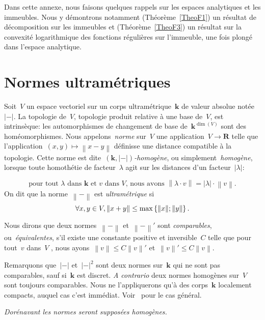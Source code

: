 \documentclass[french]{amsart}
\newcommand{\kk}{\mathbf{k}}
\newcommand{\abs}[1]{{\left|{#1}\right|}}
\newcommand{\Nm}[1]{{\left\|{#1}\right\|}}
\newcommand{\R}{\mathbf{R}}
\begin{document}
\appendix
\renewcommand{\appendixpagename}{Annexe}
\appendixpage
Dans cette annexe, nous faisons quelques rappels sur  les espaces analytiques et les immeubles. Nous y démontrons notamment (Thé\-o\-rè\-me~\ref{TheoF1})
un résultat de décomposition sur les immeubles et (Théorème~\ref{TheoF3}) un résultat sur la convexité logarithmique des fonctions régulières sur l'immeuble, une fois plongé dans l'espace analytique.

\section{Normes ultramétriques}\label{sectionC}\label{sectionC1}
Soit~$V$ un espace vectoriel sur un corps ultramétrique~$\kk$ de valeur absolue notée~$\abs{-}$. La to\-pologie de~$V$, topologie produit relative à une base de~$V$, est intrinsèque: les automorphismes de changement de base de~$\kk^{\dim(V)}$ sont des homéomorphismes. Nous appelons~\emph{norme} sur~$V$ une application~$V\to\R$ telle que l'application~$(x,y)\mapsto \Nm{x-y}$ définisse une distance compatible à la topologie. Cette norme est dite~\emph{$(\kk,\abs{-})$-homogène}, ou simplement~\emph{homogène}, lorsque toute homothétie de facteur~$\lambda$ agit sur les distances d'un facteur~$\abs{\lambda}$:
\addtocounter{equation}{1}%
\begin{equation}\label{eq22}
\text{
pour tout~$\lambda$ dans~$\kk$ et~$v$ dans~$V$, nous avons~$\Nm{\lambda\cdot v}=\abs{\lambda}\cdot\Nm{v}$.}
\end{equation}
On dit que la norme~$\Nm{-}$ est \emph{ultramétrique} si
\begin{equation}\label{eq23}
\forall x,y\in V, \Nm{x+y}\leq\max\left\{\Nm{x\vphantom{y}};\Nm{y}\right\}.
\end{equation}

Nous dirons que deux normes~$\Nm{-}$ et~$\Nm{-}'$ sont \emph{comparables}, ou~\emph{équivalentes}, s'il existe une constante positive et inversible~$C$ telle que pour tout~$v$ dans~$V$ , nous
ay\-ons~$\Nm{v}\leq C\Nm{v}'$ et~$\Nm{v}'\leq C\Nm{v}$.

Remarquons que~$\abs{-}$ et~$\abs{-}^2$ sont deux normes sur~$\kk$ qui ne sont pas comparables, sauf si~$\kk$ est discret. \emph{A contrario} deux normes homogènes sur~$V$ sont toujours comparables. Nous ne l'appliquerons qu'à des corps~$\kk$ localement compacts, auquel cas c'est immédiat. Voir~\cite{TheseV} pour le cas général.

\emph{Dorénavant les normes seront supposées homogènes.}
\end{document}
